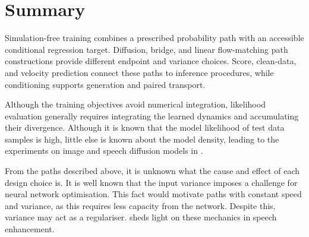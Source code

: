 \section{Summary}
Simulation-free training combines a prescribed probability path with an accessible conditional regression target. Diffusion, bridge, and linear flow-matching path constructions provide different endpoint and variance choices. Score, clean-data, and velocity prediction connect these paths to inference procedures, while conditioning supports generation and paired transport.

Although the training objectives avoid numerical integration, likelihood evaluation generally requires integrating the learned dynamics and accumulating their divergence. Although it is known that the model likelihood of test data samples is high, little else is known about the model density, leading to the experiments on image and speech diffusion models in .

From the paths described above, it is unknown what the cause and effect of each design choice is. It is well known that the input variance imposes a challenge for neural network optimisation. This fact would motivate paths with constant speed and variance, as this requires less capacity from the network. Despite this, variance may act as a regulariser.  sheds light on these mechanics in speech enhancement.

